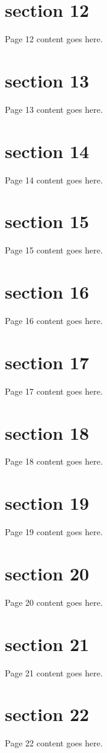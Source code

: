 \documentclass{article}
\begin{document}
\section{section 12}
Page 12 content goes here.
\newpage

\section{section 13}
Page 13 content goes here.
\newpage

\section{section 14}
Page 14 content goes here.
\newpage

\section{section 15}
Page 15 content goes here.
\newpage

\section{section 16}
Page 16 content goes here.
\newpage

\section{section 17}
Page 17 content goes here.
\newpage

\section{section 18}
Page 18 content goes here.
\newpage

\section{section 19}
Page 19 content goes here.
\newpage

\section{section 20}
Page 20 content goes here.
\newpage

\section{section 21}
Page 21 content goes here.
\newpage

\section{section 22}
Page 22 content goes here.
\newpage
\end{document}
